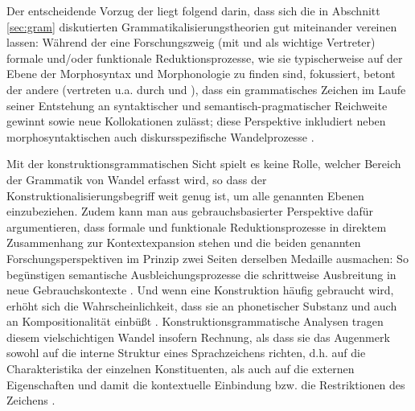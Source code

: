 Der entscheidende Vorzug der  liegt \textcite[60--62]{Traugott2015} folgend darin, dass sich die in Abschnitt \ref{sec:gram}  diskutierten Grammatikalisierungstheorien gut miteinander vereinen lassen: Während der eine Forschungszweig (mit \citealt{Lehmann1995} und \citealt{Haspelmath2004} als wichtige Vertreter) formale und/\-oder funktionale Reduktionsprozesse, wie sie typischerweise auf der Ebene der Morphosyntax und Morphonologie zu finden sind, fokussiert, betont der andere (vertreten u.a. durch \citealt{Himmelmann2004} und \citealt{Croft2006}), dass ein grammatisches Zeichen im Laufe seiner Entstehung an syntaktischer und semantisch-pragmatischer Reichweite gewinnt sowie neue Kollokationen zulässt; diese Perspektive inkludiert neben morphosyntaktischen auch diskursspezifische Wandelprozesse \parencite[vgl. den Begriff der  für die Entwicklung von Diskursmarkern bei][]{Auer2005}. 

Mit der konstruktionsgrammatischen Sicht spielt es keine Rolle, welcher Bereich der Grammatik von Wandel erfasst wird, so dass der Konstruktionalisierungsbegriff  weit genug ist, um alle genannten Ebenen einzubeziehen. Zudem kann man aus gebrauchsbasierter Perspektive dafür argumentieren, dass formale und funktionale Reduktionsprozesse in direktem Zusammenhang zur Kontextexpansion  stehen und die beiden genannten Forschungsperspektiven im Prinzip zwei Seiten derselben Medaille ausmachen: So begünstigen semantische Ausbleichungsprozesse die schrittweise Ausbreitung in neue Gebrauchskontexte \parencite[61]{Traugott2015}. Und wenn eine Konstruktion  häufig gebraucht wird, erhöht sich die Wahrscheinlichkeit, dass sie an phonetischer Substanz und auch an Kompositionalität einbüßt \parencite[20]{Bybee2010}.  Konstruktionsgrammatische Analysen tragen diesem vielschichtigen Wandel insofern Rechnung, als dass sie das Augenmerk sowohl auf die interne Struktur eines Sprachzeichens richten, d.h. auf die Charakteristika der einzelnen Konstituenten, als auch auf die externen Eigenschaften und damit die kontextuelle Einbindung bzw. die Restriktionen des Zeichens  \parencite[zu diesem externen/internen Kontrast s. weiterführend][]{Fried2013}.  

